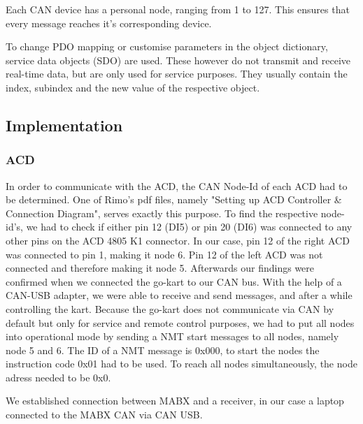 Each CAN device has a personal node, ranging from 1 to 127. This ensures that every message reaches it's corresponding device.

To change PDO mapping or customise parameters in the object dictionary, service data objects (SDO) are used. These however do not transmit and receive real-time data, but are only used for service purposes. They usually contain the index, subindex and the new value of the respective object.





\subsection{Implementation}


\subsubsection{ACD}

In order to communicate with the ACD, the CAN Node-Id of each ACD had to be determined. One of Rimo's pdf files, namely "Setting up ACD Controller \& Connection Diagram", serves exactly this purpose. 
To find the respective node-id's, we had to check if either pin 12 (DI5) or pin 20 (DI6) was connected to any other pins on the ACD 4805 K1 connector. In our case, pin 12 of the right ACD was connected to pin 1, making it node 6. Pin 12 of the left ACD was not connected and therefore making it node 5. Afterwards our findings were confirmed when we connected the go-kart to our CAN bus. With the help of a CAN-USB adapter, we were able to receive and send messages, and after a while controlling the kart.
Because the go-kart does not communicate via CAN by default but only for service and remote control purposes, we had to put all nodes into operational mode by sending a NMT start messages to all nodes, namely node 5 and 6.
The ID of a NMT message is 0x000, to start the nodes the instruction code 0x01 had to be used. To reach all nodes simultaneously, the node adress needed to be 0x0. 



We established connection between MABX and a receiver, in our case a laptop connected to the MABX CAN via CAN USB.


